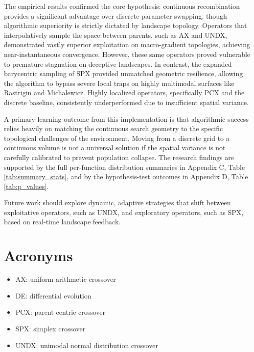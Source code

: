\documentclass[conference]{IEEEtran}
\begin{document}
The empirical results confirmed the core hypothesis: continuous recombination provides a significant advantage over discrete 
parameter swapping, though algorithmic superiority is strictly dictated by landscape topology. Operators that interpolatively sample 
the space between parents, such as AX and UNDX, demonstrated vastly superior exploitation on macro-gradient topologies, achieving 
near-instantaneous convergence. However, these same operators proved vulnerable to premature stagnation on deceptive landscapes. 
In contrast, the expanded barycentric sampling of SPX provided unmatched geometric resilience, allowing the algorithm to bypass 
severe local traps on highly multimodal surfaces like Rastrigin and Michalewicz. Highly localized operators, specifically PCX 
and the discrete baseline, consistently underperformed due to insufficient spatial variance. 

A primary learning outcome from this implementation is that algorithmic success relies heavily on matching the continuous 
search geometry to the specific topological challenges of the environment. Moving from a discrete grid to a continuous volume 
is not a universal solution if the spatial variance is not carefully calibrated to prevent population collapse. The research findings are supported by the full per-function 
distribution summaries in Appendix C, Table \ref{tab:summary_stats}, and by the hypothesis-test outcomes 
in Appendix D, Table \ref{tab:p_values}. 

Future work should explore dynamic, adaptive strategies that shift between exploitative operators, such as UNDX, 
and exploratory operators, such as SPX, based on real-time landscape feedback.

\appendices

\section{Acronyms}
\begin{itemize}
    \item AX: uniform arithmetic crossover
    \item DE: differential evolution
    \item PCX: parent-centric crossover
    \item SPX: simplex crossover
    \item UNDX: unimodal normal distribution crossover
\end{itemize}
\end{document}

